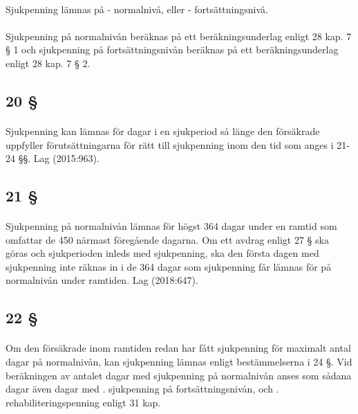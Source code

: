 \documentclass[a4paper,notitlepage,openany,10pt]{book}
\begin{document}
\paragraph*{}
Sjukpenning lämnas på
\newline - normalnivå, eller
\newline - fortsättningsnivå.
\paragraph*{}
Sjukpenning på normalnivån beräknas på ett beräkningsunderlag enligt 28 kap. 7 § 1 och sjukpenning på fortsättningsnivån beräknas på ett beräkningsunderlag enligt 28 kap. 7 § 2.
\subsection*{20 §}
\paragraph*{}
Sjukpenning kan lämnas för dagar i en sjukperiod så länge den försäkrade uppfyller förutsättningarna för rätt till sjukpenning inom den tid som anges i 21-24 §§.
Lag (2015:963).
\subsection*{21 §}
\paragraph*{}
Sjukpenning på normalnivån lämnas för högst 364 dagar under en ramtid som omfattar de 450 närmast föregående dagarna. Om ett avdrag enligt 27 § ska göras och sjukperioden inleds med sjukpenning, ska den första dagen med sjukpenning inte räknas in i de 364 dagar som sjukpenning får lämnas för på normalnivån under ramtiden.
Lag (2018:647).
\subsection*{22 §}
\paragraph*{}
Om den försäkrade inom ramtiden redan har fått sjukpenning för maximalt antal dagar på normalnivån, kan sjukpenning lämnas enligt bestämmelserna i 24 §. Vid beräkningen av antalet dagar med sjukpenning på normalnivån anses som sådana dagar även dagar med
. sjukpenning på fortsättningsnivån, och
. rehabiliteringspenning enligt 31 kap.
\end{document}
